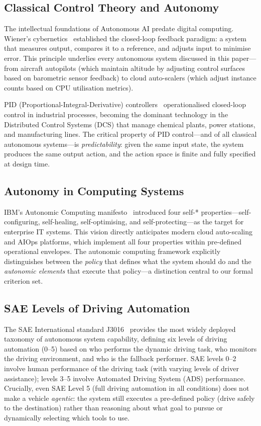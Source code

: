 \documentclass[12pt, a4paper]{article}
\begin{document}
\subsection{Classical Control Theory and Autonomy}
The intellectual foundations of Autonomous AI predate digital computing. Wiener's cybernetics~\citep{wiener1948cybernetics} established the closed-loop feedback paradigm: a system that measures output, compares it to a reference, and adjusts input to minimise error. This principle underlies every autonomous system discussed in this paper---from aircraft autopilots (which maintain altitude by adjusting control surfaces based on barometric sensor feedback) to cloud auto-scalers (which adjust instance counts based on CPU utilisation metrics).

PID (Proportional-Integral-Derivative) controllers~\citep{astrom2006pid} operationalised closed-loop control in industrial processes, becoming the dominant technology in the Distributed Control Systems (DCS) that manage chemical plants, power stations, and manufacturing lines. The critical property of PID control---and of all classical autonomous systems---is \emph{predictability}: given the same input state, the system produces the same output action, and the action space is finite and fully specified at design time.

\subsection{Autonomy in Computing Systems}
IBM's Autonomic Computing manifesto~\citep{kephart2003autonomic} introduced four self-* properties---self-configuring, self-healing, self-optimising, and self-protecting---as the target for enterprise IT systems. This vision directly anticipates modern cloud auto-scaling and AIOps platforms, which implement all four properties within pre-defined operational envelopes. The autonomic computing framework explicitly distinguishes between the \emph{policy} that defines what the system should do and the \emph{autonomic elements} that execute that policy---a distinction central to our formal criterion set.

\subsection{SAE Levels of Driving Automation}
The SAE International standard J3016~\citep{sae2021j3016} provides the most widely deployed taxonomy of autonomous system capability, defining six levels of driving automation (0--5) based on who performs the dynamic driving task, who monitors the driving environment, and who is the fallback performer. SAE levels 0--2 involve human performance of the driving task (with varying levels of driver assistance); levels 3--5 involve Automated Driving System (ADS) performance. Crucially, even SAE Level 5 (full driving automation in all conditions) does not make a vehicle \emph{agentic}: the system still executes a pre-defined policy (drive safely to the destination) rather than reasoning about what goal to pursue or dynamically selecting which tools to use.
\end{document}
